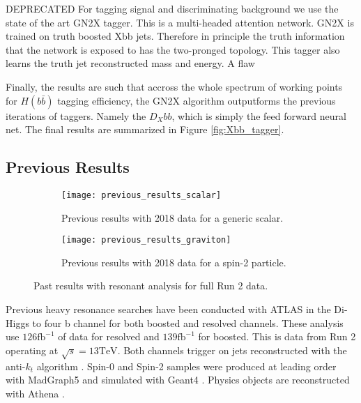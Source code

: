 \documentclass[12pt]{article}
\begin{document}
\vspace{10pt}
DEPRECATED
For tagging signal and discriminating background we use the state of the art
GN2X tagger. This is a multi-headed attention network. GN2X\* is trained on
truth boosted Xbb jets. Therefore in principle the truth information that the
network is exposed to has the two-pronged topology. This tagger also learns the
truth jet reconstructed mass and energy. A flaw 

Finally, the results are such that accross the whole spectrum of working points
for $H(b\bar{b})$ tagging efficiency, the GN2X algorithm outputforms the
previous iterations of taggers. Namely the $D_Xbb$, which is simply the feed
forward neural net. The final results are summarized in Figure
\ref{fig:Xbb_tagger}.

\newpage
\subsection{Previous Results}
\begin{figure}[t]
    \centering
    \begin{subfigure}[t]{.48\textwidth}
        \centering
        \texttt{[image: previous\_results\_scalar]}
        \caption{Previous results with 2018 data for a generic scalar.}
        \label{subfig:previous_results_scalar}
    \end{subfigure}
    \hfill
    \begin{subfigure}[t]{.48\textwidth}
        \centering
        \texttt{[image: previous\_results\_graviton]}
        \caption{Previous results with 2018 data for a spin-2 particle.}
        \label{subfig:previous_results_graviton}
    \end{subfigure}
\caption{Past results with resonant analysis for full Run 2 data.}
\label{fig:previous_results}
\end{figure}

Previous heavy resonance searches have been conducted with ATLAS in the Di-Higgs
to four b channel for both boosted and resolved channels. These analysis use
$126 \text{fb}^{-1}$ of data for resolved and $139\text{fb}^{-1}$ for boosted.
This is data from Run 2 operating at $\sqrt{s}=13\text{TeV}$. Both channels
trigger on jets reconstructed with the anti-$k_t$ algorithm \cite{antikt}.
Spin-0 and Spin-2 samples were produced at leading order with MadGraph5
\cite{madgraph5_OG} and simulated with Geant4 \cite{geant4}. Physics objects are
reconstructed with Athena \cite{atlas_simulation}.
\end{document}
